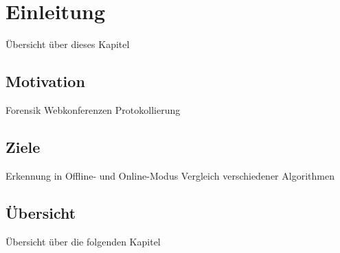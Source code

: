 \chapter{Einleitung}
Übersicht über dieses Kapitel

\section{Motivation}
Forensik
Webkonferenzen
Protokollierung

\section{Ziele}
Erkennung in Offline- und Online-Modus
Vergleich verschiedener Algorithmen

\section{Übersicht}
Übersicht über die folgenden Kapitel
